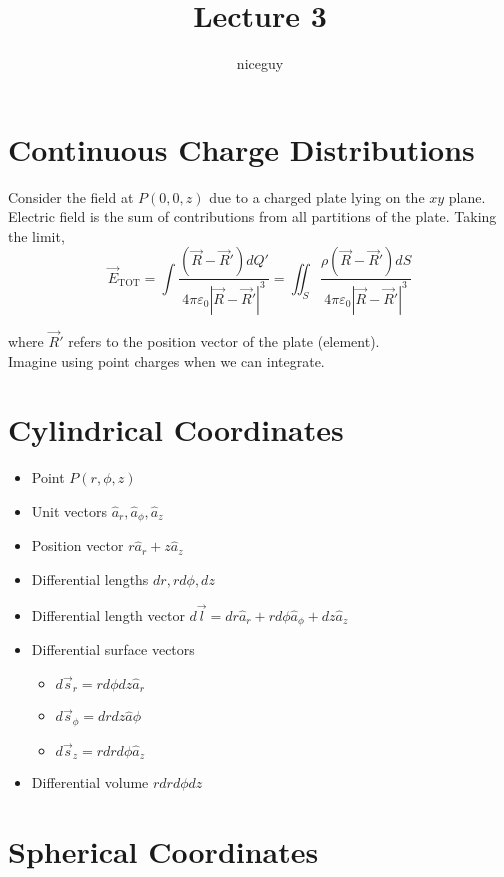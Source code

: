\documentclass[12pt]{article}
\author{niceguy}
\title{Lecture 3}
\begin{document}
\maketitle

\section{Continuous Charge Distributions}

Consider the field at $P(0,0,z)$ due to a charged plate lying on the $xy$ plane. Electric field is the sum of contributions from all partitions of the plate. Taking the limit,
$$\vec{E}_{\mathrm{TOT}} = \int \frac{(\vec{R}-\vec{R}')dQ'}{4\pi\varepsilon_0|\vec{R}-\vec{R}'|^3} = \iint_S \frac{\rho(\vec{R}-\vec{R}')dS}{4\pi\varepsilon_0|\vec{R}-\vec{R}'|^3}$$

where $\vec{R}'$ refers to the position vector of the plate (element). \\
Imagine using point charges when we can integrate.

\section{Cylindrical Coordinates}

\begin{itemize}
	\item Point $P(r,\phi,z)$
	\item Unit vectors $\hat{a}_r, \hat{a}_\phi, \hat{a}_z$
	\item Position vector $r\hat{a}_r+z\hat{a}_z$
	\item Differential lengths $dr,rd\phi,dz$
	\item Differential length vector $d\vec{l} = dr\hat{a}_r + rd\phi\hat{a}_\phi + dz\hat{a}_z$
	\item Differential surface vectors
		\begin{itemize}
			\item $d\vec{s}_r = rd\phi dz\hat{a}_r$
			\item $d\vec{s}_\phi = drdz\hat{a}\phi$
			\item $d\vec{s}_z = rdrd\phi\hat{a}_z$
		\end{itemize}
	\item Differential volume $rdrd\phi dz$
\end{itemize}

\section{Spherical Coordinates}
\end{document}
